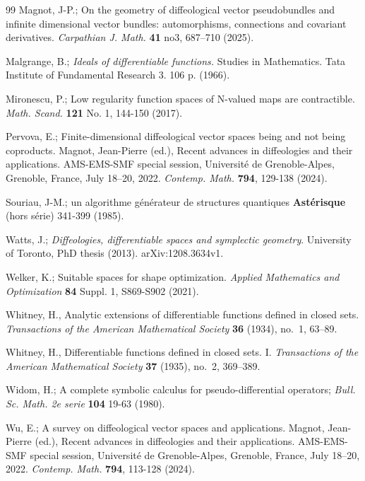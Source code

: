 \documentclass{amsart}
\newcounter{thm}
\newcounter{ex}
\newcounter{re}
\begin{document}
\begin{thebibliography}{99}
 Magnot, J-P.; On the geometry of diffeological vector pseudobundles and infinite dimensional vector bundles: automorphisms, connections and covariant derivatives. \emph{Carpathian J. Math.} {\bf 41} no3, 687--710 (2025).

 Malgrange, B.;
\emph{Ideals of differentiable functions.} 
Studies in Mathematics. Tata Institute of Fundamental Research 3.  106 p. (1966). 

 Mironescu, P.;
Low regularity function spaces of N-valued maps are contractible. 
\emph{Math. Scand.} {\bf 121} No. 1, 144-150 (2017).

 Pervova, E.;
Finite-dimensional diffeological vector spaces being and not being coproducts. 
Magnot, Jean-Pierre (ed.), Recent advances in diffeologies and their applications. AMS-EMS-SMF special session, Université de Grenoble-Alpes, Grenoble, France, July 18–20, 2022.  \emph{Contemp. Math.} {\bf 794}, 129-138 (2024). 

 Souriau, J-M.; un algorithme g\'en\'erateur de structures quantiques \textbf{Ast\'erisque} (hors s\'erie) 341-399 (1985).
 
 Watts, J.; \textit{Diffeologies, differentiable spaces and symplectic geometry}. University of Toronto,
PhD thesis (2013). arXiv:1208.3634v1.

			{Welker, K.};
			 Suitable spaces for shape optimization.
		{\em Applied Mathematics and Optimization} {\bf 84\/} Suppl. 1, S869-S902 (2021).
{\color{black}
Whitney, H.,
Analytic extensions of differentiable functions defined in closed sets.
\textit{Transactions of the American Mathematical Society}
\textbf{36} (1934), no.~1, 63--89.

Whitney, H.,
Differentiable functions defined in closed sets. I.
\textit{Transactions of the American Mathematical Society}
\textbf{37} (1935), no.~2, 369--389.
}
 Widom, H.; { A complete symbolic calculus for pseudo-differential operators}; {\it Bull. Sc. Math. 2e serie} \textbf{104} 19-63  (1980).

  Wu, E.;
A survey on diffeological vector spaces and applications. 
Magnot, Jean-Pierre (ed.), Recent advances in diffeologies and their applications. AMS-EMS-SMF special session, Université de Grenoble-Alpes, Grenoble, France, July 18–20, 2022.  \emph{Contemp. Math.} {\bf 794}, 113-128 (2024).


\end{thebibliography}
\end{document}
